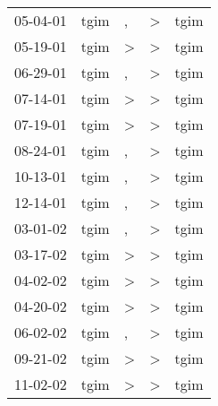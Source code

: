 \begin{supertabular}{p{0.07\textwidth}p{0.06\textwidth}p{0.02\textwidth}p{0.02\textwidth}p{0.06\textwidth}}
 05-04-01\textsuperscript{} &  tgim\textsuperscript{} &                , &  \textgreater &           tgim\textsuperscript{} \\
 05-19-01\textsuperscript{} &  tgim\textsuperscript{} &     \textgreater &  \textgreater &           tgim\textsuperscript{} \\
 06-29-01\textsuperscript{} &  tgim\textsuperscript{} &                , &  \textgreater &           tgim\textsuperscript{} \\
 07-14-01\textsuperscript{} &  tgim\textsuperscript{} &     \textgreater &  \textgreater &           tgim\textsuperscript{} \\
 07-19-01\textsuperscript{} &  tgim\textsuperscript{} &     \textgreater &  \textgreater &           tgim\textsuperscript{} \\
 08-24-01\textsuperscript{} &  tgim\textsuperscript{} &                , &  \textgreater &           tgim\textsuperscript{} \\
 10-13-01\textsuperscript{} &  tgim\textsuperscript{} &                , &  \textgreater &           tgim\textsuperscript{} \\
 12-14-01\textsuperscript{} &  tgim\textsuperscript{} &                , &  \textgreater &           tgim\textsuperscript{} \\
 03-01-02\textsuperscript{} &  tgim\textsuperscript{} &                , &  \textgreater &           tgim\textsuperscript{} \\
 03-17-02\textsuperscript{} &  tgim\textsuperscript{} &     \textgreater &  \textgreater &           tgim\textsuperscript{} \\
 04-02-02\textsuperscript{} &  tgim\textsuperscript{} &     \textgreater &  \textgreater &           tgim\textsuperscript{} \\
 04-20-02\textsuperscript{} &  tgim\textsuperscript{} &     \textgreater &  \textgreater &           tgim\textsuperscript{} \\
 06-02-02\textsuperscript{} &  tgim\textsuperscript{} &                , &  \textgreater &           tgim\textsuperscript{} \\
 09-21-02\textsuperscript{} &  tgim\textsuperscript{} &     \textgreater &  \textgreater &           tgim\textsuperscript{} \\
 11-02-02\textsuperscript{} &  tgim\textsuperscript{} &     \textgreater &  \textgreater &           tgim\textsuperscript{} \\

\end{supertabular}

